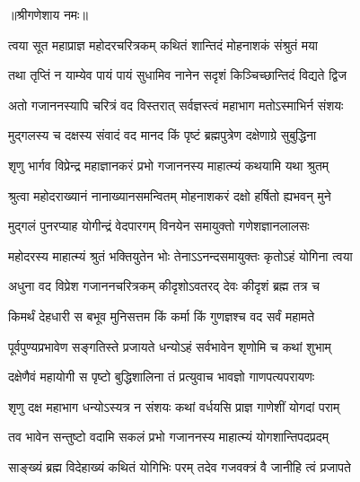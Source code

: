 \label{sec:chaturthi-tapo-varnanam}

\centerline{॥श्रीगणेशाय नमः॥}


\twolineshloka
{त्वया सूत महाप्राज्ञ महोदरचरित्रकम्}
{कथितं शान्तिदं मोहनाशकं संश्रुतं मया} %

\twolineshloka
{तथा तृप्तिं न याम्येव पायं पायं सुधामिव}
{नानेन सदृशं किञ्चिच्छान्तिदं विद्यते द्विज} %

\twolineshloka
{अतो गजाननस्यापि चरित्रं वद विस्तरात्}
{सर्वज्ञस्त्वं महाभाग मतोऽस्माभिर्न संशयः} %

\twolineshloka
{मुद्गलस्य च दक्षस्य संवादं वद मानद}
{किं पृष्टं ब्रह्मपुत्रेण दक्षेणाग्रे सुबुद्धिना} %


\twolineshloka
{श‍ृणु भार्गव विप्रेन्द्र महाज्ञानकरं प्रभो}
{गजाननस्य माहात्म्यं कथयामि यथा श्रुतम्} %

\twolineshloka
{श्रुत्वा महोदराख्यानं नानाख्यानसमन्वितम्}
{मोहनाशकरं दक्षो हर्षितो ह्यभवन् मुने} %

\twolineshloka
{मुद्गलं पुनरप्याह योगीन्द्रं वेदपारगम्}
{विनयेन समायुक्तो गणेशज्ञानलालसः} %


\twolineshloka
{महोदरस्य माहात्म्यं श्रुतं भक्तियुतेन भोः}
{तेनाऽऽनन्दसमायुक्तः कृतोऽहं योगिना त्वया} %

\twolineshloka
{अधुना वद विप्रेश गजाननचरित्रकम्}
{कीदृशोऽवतरद् देवः कीदृशं ब्रह्म तत्र च} %

\twolineshloka
{किमर्थं देहधारी स बभूव मुनिसत्तम}
{किं कर्मा किं गुणज्ञश्च वद सर्वं महामते} %

\twolineshloka
{पूर्वपुण्यप्रभावेण सङ्गतिस्ते प्रजायते}
{धन्योऽहं सर्वभावेन श‍ृणोमि च कथां शुभाम्} %


\twolineshloka
{दक्षेणैवं महायोगी स पृष्टो बुद्धिशालिना}
{तं प्रत्युवाच भावज्ञो गाणपत्यपरायणः} %


\twolineshloka
{श‍ृणु दक्ष महाभाग धन्योऽस्यत्र न संशयः}
{कथां वर्धयसि प्राज्ञ गाणेशीं योगदां पराम्} %

\twolineshloka
{तव भावेन सन्तुष्टो वदामि सकलं प्रभो}
{गजाननस्य माहात्म्यं योगशान्तिपदप्रदम्} %

\twolineshloka
{साङ्ख्यं ब्रह्म विदेहाख्यं कथितं योगिभिः परम्}
{तदेव गजवक्त्रं वै जानीहि त्वं प्रजापते} %

